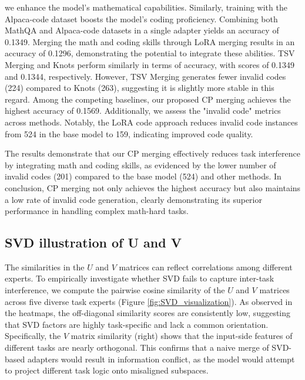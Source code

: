 \documentclass[10pt]{article} %
\begin{document}
    we enhance the model's mathematical capabilities. Similarly, training with
    the Alpaca-code dataset boosts the model's coding proficiency. Combining both
    MathQA and Alpaca-code datasets in a single adapter yields an accuracy of 0.1349.
    Merging the math and coding skills through LoRA merging results in an
    accuracy of 0.1296, demonstrating the potential to integrate these abilities. TSV Merging and Knots perform similarly in terms of accuracy, with scores of 0.1349 and 0.1344, respectively. However, TSV Merging generates fewer invalid codes (224) compared to Knots (263), suggesting it is slightly more stable in this regard.
    Among the competing baselines, our proposed CP merging achieves the highest accuracy
    of 0.1569. Additionally, we assess the "invalid code" metrics across methods.
    Notably, the LoRA code approach reduces invalid code instances from 524 in the
    base model to 159, indicating improved code quality. 

    The results demonstrate that our CP merging effectively reduces task
    interference by integrating math and coding skills, as evidenced by the lower
    number of invalid codes (201) compared to the base model (524) and other methods. In conclusion, CP merging not only achieves the highest accuracy but also maintains a low rate of invalid code generation, clearly demonstrating its superior performance in handling complex math-hard tasks.





\subsection{SVD illustration of U and V}

The similarities in the $U$ and $V$ matrices can reflect correlations among different experts. To empirically investigate whether SVD fails to capture inter-task interference, we compute the pairwise cosine similarity of the $U$ and $V$ matrices across five diverse task experts (Figure \ref{fig:SVD_visualization}). As observed in the heatmaps, the off-diagonal similarity scores are consistently low, suggesting that SVD factors are highly task-specific and lack a common orientation. Specifically, the $V$ matrix similarity (right) shows that the input-side features of different tasks are nearly orthogonal. This confirms that a naive merge of SVD-based adapters would result in information conflict, as the model would attempt to project different task logic onto misaligned subspaces.
\end{document}
